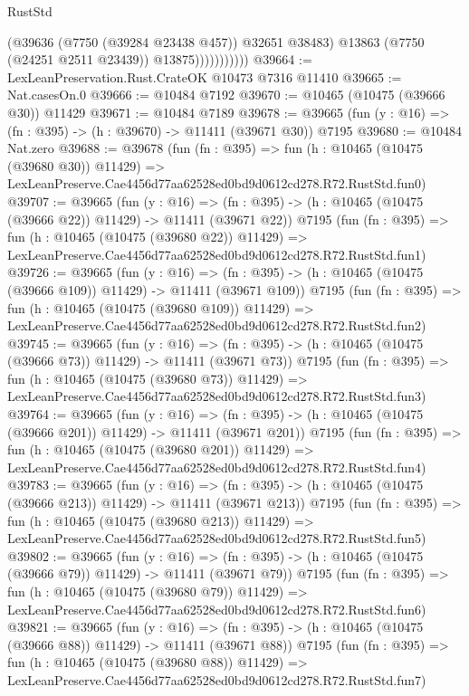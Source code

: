 \begin{lexlean}{RustStd}
\begin{coremodule}
                          (@39636 (@7750 (@39284 @23438 @457)) @32651 @38483)
                          @13863
                          (@7750 (@24251 @2511 @23439))
                          @13875)))))))))))
@39664 := LexLeanPreservation.Rust.CrateOK @10473 @7316 @11410
@39665 := Nat.casesOn.{0}
@39666 := @10484 @7192
@39670 := @10465 (@10475 (@39666 @30)) @11429
@39671 := @10484 @7189
@39678 := @39665 (fun (y : @16) => (fn : @395) -> (h : @39670) -> @11411 (@39671 @30)) @7195
@39680 := @10484 Nat.zero
@39688 := @39678
    (fun (fn : @395) =>
    fun (h : @10465 (@10475 (@39680 @30)) @11429) =>
    LexLeanPreserve.Cae4456d77aa62528ed0bd9d0612cd278.R72.RustStd.fun0)
@39707 := @39665
    (fun (y : @16) =>
    (fn : @395) -> (h : @10465 (@10475 (@39666 @22)) @11429) -> @11411 (@39671 @22))
    @7195
    (fun (fn : @395) =>
    fun (h : @10465 (@10475 (@39680 @22)) @11429) =>
    LexLeanPreserve.Cae4456d77aa62528ed0bd9d0612cd278.R72.RustStd.fun1)
@39726 := @39665
    (fun (y : @16) =>
    (fn : @395) -> (h : @10465 (@10475 (@39666 @109)) @11429) -> @11411 (@39671 @109))
    @7195
    (fun (fn : @395) =>
    fun (h : @10465 (@10475 (@39680 @109)) @11429) =>
    LexLeanPreserve.Cae4456d77aa62528ed0bd9d0612cd278.R72.RustStd.fun2)
@39745 := @39665
    (fun (y : @16) =>
    (fn : @395) -> (h : @10465 (@10475 (@39666 @73)) @11429) -> @11411 (@39671 @73))
    @7195
    (fun (fn : @395) =>
    fun (h : @10465 (@10475 (@39680 @73)) @11429) =>
    LexLeanPreserve.Cae4456d77aa62528ed0bd9d0612cd278.R72.RustStd.fun3)
@39764 := @39665
    (fun (y : @16) =>
    (fn : @395) -> (h : @10465 (@10475 (@39666 @201)) @11429) -> @11411 (@39671 @201))
    @7195
    (fun (fn : @395) =>
    fun (h : @10465 (@10475 (@39680 @201)) @11429) =>
    LexLeanPreserve.Cae4456d77aa62528ed0bd9d0612cd278.R72.RustStd.fun4)
@39783 := @39665
    (fun (y : @16) =>
    (fn : @395) -> (h : @10465 (@10475 (@39666 @213)) @11429) -> @11411 (@39671 @213))
    @7195
    (fun (fn : @395) =>
    fun (h : @10465 (@10475 (@39680 @213)) @11429) =>
    LexLeanPreserve.Cae4456d77aa62528ed0bd9d0612cd278.R72.RustStd.fun5)
@39802 := @39665
    (fun (y : @16) =>
    (fn : @395) -> (h : @10465 (@10475 (@39666 @79)) @11429) -> @11411 (@39671 @79))
    @7195
    (fun (fn : @395) =>
    fun (h : @10465 (@10475 (@39680 @79)) @11429) =>
    LexLeanPreserve.Cae4456d77aa62528ed0bd9d0612cd278.R72.RustStd.fun6)
@39821 := @39665
    (fun (y : @16) =>
    (fn : @395) -> (h : @10465 (@10475 (@39666 @88)) @11429) -> @11411 (@39671 @88))
    @7195
    (fun (fn : @395) =>
    fun (h : @10465 (@10475 (@39680 @88)) @11429) =>
    LexLeanPreserve.Cae4456d77aa62528ed0bd9d0612cd278.R72.RustStd.fun7)

\end{coremodule}
\end{lexlean}
